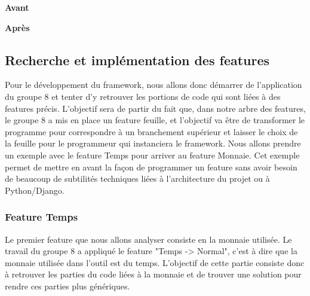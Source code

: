 \begin{description}
\begin{minipage}{.5\textwidth}
\begin{center} \textbf{Avant}


\end{center}
\end{minipage}
\hspace{0.3cm}
\begin{minipage}{.5\textwidth}
\begin{center} \textbf{Après}\end{center}


\end{minipage}
\vspace{0.3cm}

\end{description}


\subsection{Recherche et implémentation des features}

Pour le développement du framework,  nous allons donc démarrer de l'application du groupe 8 et tenter d'y retrouver les portions de code qui sont liées à des features précis.  L'objectif sera de partir du fait que,  dans notre arbre des features,  le groupe 8 a mis en place un feature feuille,  et l'objectif va être de transformer le programme pour correspondre à un branchement supérieur et laisser le choix de la feuille pour le programmeur qui instanciera le framework.  Nous allons prendre un exemple avec le feature Temps pour arriver au feature Monnaie.  Cet exemple permet de mettre en avant la façon de programmer un feature sans avoir besoin de beaucoup de subtilités techniques liées à l'architecture du projet ou à Python/Django.

\subsubsection{Feature Temps}

Le premier feature que nous allons analyser consiste en la monnaie utilisée.  Le travail du groupe 8 a appliqué le feature "Temps -> Normal",  c'est à dire que la monnaie utilisée dans l'outil est du temps.  L'objectif de cette partie consiste donc à retrouver les parties du code liées à la monnaie et de trouver une solution pour rendre ces parties plus génériques.

